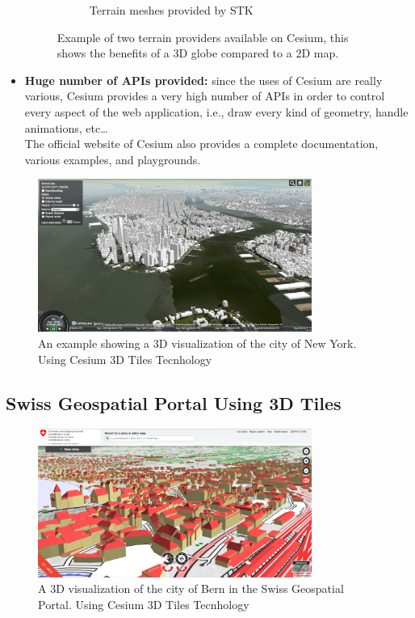 \begin{itemize}
\begin{figure} [H]
\begin{subfigure}[b]{0.3\textwidth}
			\caption{Terrain meshes provided by STK}
			\label{fig:3D-Map}
		\end{subfigure}
		\caption{Example of two terrain providers available on Cesium, this shows the benefits of a 3D globe compared to a 2D map.}
	\end{figure}
	\item {\bf Huge number of APIs provided:} since the uses of Cesium are really various, Cesium provides a very high number of APIs in order to control every aspect of the web application, i.e., draw every kind of geometry, handle animations, etc\dots\\The official website of Cesium also provides a complete documentation, various examples, and playgrounds.
\end{itemize}
\begin{center}
\end{center}
\begin{figure} [H]
\centering
\includegraphics[width=0.8\textwidth]{chapter2/images/NewYorkCityCesium3dTiles}
\caption{An example showing a 3D visualization of the city of New York. Using Cesium 3D Tiles Tecnhology}
\label{fig:NewYorkCityCesium3dTiles}
\end{figure}
\subsection{Swiss Geospatial Portal Using 3D Tiles}
\begin{center}
\end{center}


\begin{figure} [H]
\centering
\includegraphics[width=0.8\textwidth]{chapter2/images/BernCitySwissTopo}
\caption{A 3D visualization of the city of Bern in the Swiss Geospatial Portal. Using Cesium 3D Tiles Tecnhology}
\label{fig:BernCitySwissTopo}
\end{figure}